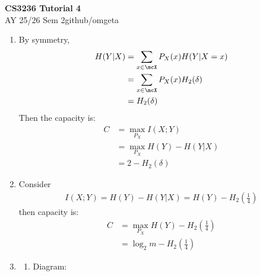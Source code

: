 \documentclass[12pt, a4paper]{article}
\newcommand{\mytitle}{CS3236 Tutorial 4}
\newcommand{\myauthor}{github/omgeta}
\newcommand{\mydate}{AY 25/26 Sem 2}
\begin{document}
\raggedright
\footnotesize
\begin{center}
{\normalsize{\textbf{\mytitle}}} \\
{\footnotesize{\mydate\hspace{2pt}\textemdash\hspace{2pt}\myauthor}}
\end{center}
\begin{enumerate}
  \item By symmetry,
    \begin{align*}
      H(Y|X) &= \sum_{x\in\mcX}P_X(x)H(Y|X=x)\\ 
             &= \sum_{x\in\mcX}P_X(x)H_2(\delta)\\ 
             &= H_2(\delta)
    \end{align*}
    Then the capacity is:
    \begin{align*}
      C &= \max_{P_X}I(X;Y)\\ 
        &= \max_{P_X}H(Y) - H(Y|X)\\ 
        &= 2 - H_2(\delta)
    \end{align*}

  \item Consider 
    \begin{align*}
      I(X;Y) = H(Y) - H(Y|X) = H(Y) - H_2(\frac{1}{4})
    \end{align*}
    then capacity is:
    \begin{align*}
      C &= \max_{P_X}H(Y) - H_2(\frac{1}{4})\\ 
        &= \log_2m - H_2(\frac{1}{4})
    \end{align*}

  \item 
    \begin{enumerate}
      \item Diagram:\\


\end{enumerate}
\end{enumerate}
\end{document}
